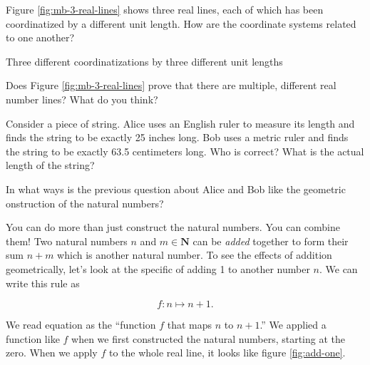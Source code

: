 \begin{question}
  Figure \ref{fig:mb-3-real-lines} shows three real lines, each of which has been coordinatized by a different unit length. How are the coordinate systems related to one another?
\end{question}

\begin{marginfigure}
  
  \caption{\label{fig:mb-3-real-lines} Three different coordinatizations by three different unit lengths}
\end{marginfigure}

\begin{question}
  Does Figure \ref{fig:mb-3-real-lines} prove that there are multiple, different real number lines? What do you think?
\end{question}

\begin{question}
  Consider a piece of string. Alice uses an English ruler to measure its length and finds the string to be exactly 25 inches long. Bob uses a metric ruler and finds the string to be exactly 63.5 centimeters long. Who is correct? What is the actual length of the string?
\end{question}

\begin{question}
  In what ways is the previous question about Alice and Bob like the geometric onstruction of the natural numbers?
\end{question}


You can do more than just construct the natural numbers. You can combine them! Two natural numbers $n$ and $m \in\mathbf{N}$ can be \emph{added} together to form their sum $n+m$ which is another natural number. To see the effects of addition geometrically, let's look at the specific of adding 1 to another number $n$. We can write this rule as

\begin{equation}
  \label{eqn:add-one}
  f: n \mapsto n + 1.
\end{equation}

We read equation \label{eqn:add-one} as the ``function $f$ that maps $n$ to $n + 1$.'' We applied a function like $f$ when we first constructed the natural numbers, starting at the zero. When we apply $f$ to the whole real line, it looks like figure \ref{fig:add-one}.

